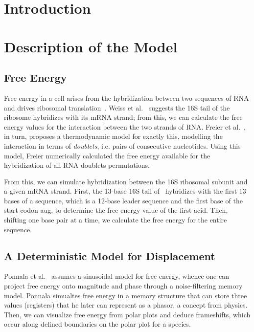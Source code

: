 \documentclass[12pt, draft]{article}
\numberwithin{equation}{section}
\begin{document}
\section{Introduction}

\section{Description of the Model}
\subsection{Free Energy}
\label{freeenergy}

Free energy in a cell arises from the hybridization between two
sequences of RNA and drives ribosomal translation~\cite{starmer}.
Weiss et al.~\cite{weiss} suggests the 16S tail of the ribosome hybridizes with its mRNA strand;
from this, we can calculate the free energy values for the interaction between the two strands of RNA.
Freier et al.~\cite{freier}, in turn, proposes a thermodynamic model for exactly this,
modelling the interaction in terms of \emph{doublets}, i.e. pairs of consecutive nucleotides.
Using this model, Freier numerically calculated the free energy available
for the hybridization of all RNA doublets permutations.

From this, we can simulate hybridization between the 16S ribosomal subunit and a given mRNA strand.
First, the 13-base 16S tail of \ecoli\ hybridizes with the first 13 bases of a sequence, which
is a 12-base leader sequence and the first base of the start codon aug, to determine
the free energy value of the first acid.
Then, shifting one base pair at a time, we calculate the free energy for the entire sequence.

\subsection{A Deterministic Model for Displacement}

Ponnala et al.~\cite{lalit:mechanics} assumes a sinusoidal model for free energy, whence one can project free energy
onto magnitude and phase through a noise-filtering memory model. Ponnala simualtes free energy in a memory structure
that can store three values (registers) that he later can represent as a phasor, a concept from physics. Then,
we can visualize free energy from polar plots and deduce frameshifts, which occur along defined boundaries on the
polar plot for a species.
\end{document}
